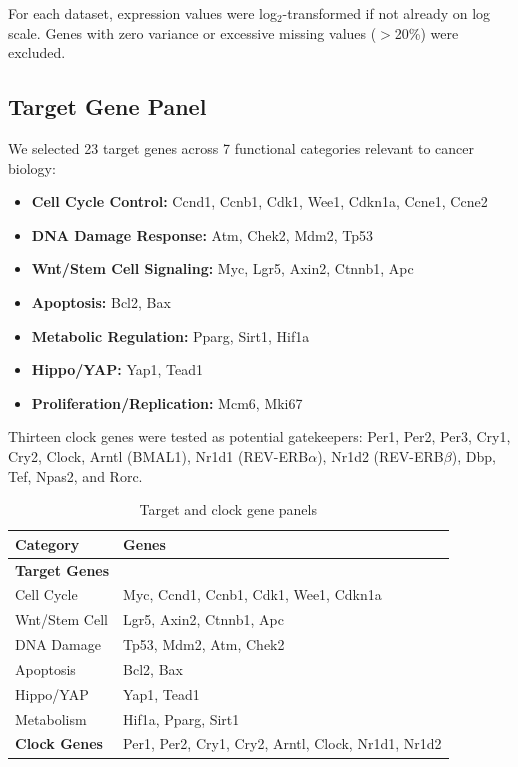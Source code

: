 \documentclass[11pt,a4paper]{article}
\begin{document}
For each dataset, expression values were log$_2$-transformed if not already on log scale. Genes with zero variance or excessive missing values ($>$20\%) were excluded.

\subsection{Target Gene Panel}

We selected 23 target genes across 7 functional categories relevant to cancer biology:

\begin{itemize}[noitemsep]
    \item \textbf{Cell Cycle Control:} Ccnd1, Ccnb1, Cdk1, Wee1, Cdkn1a, Ccne1, Ccne2
    \item \textbf{DNA Damage Response:} Atm, Chek2, Mdm2, Tp53
    \item \textbf{Wnt/Stem Cell Signaling:} Myc, Lgr5, Axin2, Ctnnb1, Apc
    \item \textbf{Apoptosis:} Bcl2, Bax
    \item \textbf{Metabolic Regulation:} Pparg, Sirt1, Hif1a
    \item \textbf{Hippo/YAP:} Yap1, Tead1
    \item \textbf{Proliferation/Replication:} Mcm6, Mki67
\end{itemize}

Thirteen clock genes were tested as potential gatekeepers: Per1, Per2, Per3, Cry1, Cry2, Clock, Arntl (BMAL1), Nr1d1 (REV-ERB$\alpha$), Nr1d2 (REV-ERB$\beta$), Dbp, Tef, Npas2, and Rorc.

\begin{table}[H]
\centering
\caption{Target and clock gene panels}
\label{tab:genes}
\begin{tabular}{ll}
\toprule
Category & Genes \\
\midrule
\textbf{Target Genes} & \\
Cell Cycle & Myc, Ccnd1, Ccnb1, Cdk1, Wee1, Cdkn1a \\
Wnt/Stem Cell & Lgr5, Axin2, Ctnnb1, Apc \\
DNA Damage & Tp53, Mdm2, Atm, Chek2 \\
Apoptosis & Bcl2, Bax \\
Hippo/YAP & Yap1, Tead1 \\
Metabolism & Hif1a, Pparg, Sirt1 \\
\midrule
\textbf{Clock Genes} & Per1, Per2, Cry1, Cry2, Arntl, Clock, Nr1d1, Nr1d2 \\
\bottomrule
\end{tabular}
\end{table}
\end{document}
